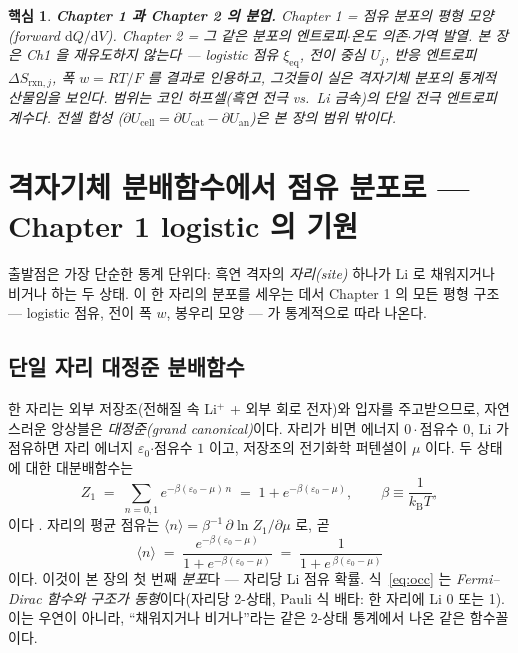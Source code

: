 \documentclass[11pt,a4paper]{article}
\newtheorem*{keybox}{핵심}
\newcommand{\dd}{\mathrm{d}}
\newcommand{\rxn}{\mathrm{rxn}}
\newcommand{\eq}{\mathrm{eq}}
\newcommand{\kB}{k_{\mathrm{B}}}
\newcommand{\avg}[1]{\langle #1\rangle}
\begin{document}
\begin{keybox}
\textbf{Chapter 1 과 Chapter 2 의 분업.} Chapter 1 = 점유 분포의 \emph{평형 모양}(forward
$\dd Q/\dd V$). Chapter 2 = 그 \emph{같은 분포}의 엔트로피$\cdot$온도 의존$\cdot$가역 발열. 본 장은 Ch1
을 재유도하지 않는다 — logistic 점유 $\xi_\eq$, 전이 중심 $U_j$, 반응 엔트로피 $\Delta S_{\rxn,j}$,
폭 $w=RT/F$ 를 \emph{결과로 인용}하고, 그것들이 실은 격자기체 분포의 통계적 산물임을 보인다. 범위는
\emph{코인 하프셀}(흑연 전극 vs.\ Li 금속)의 단일 전극 엔트로피 계수다. 전셀 합성
($\partial U_\mathrm{cell}=\partial U_\mathrm{cat}-\partial U_\mathrm{an}$)은 본 장의 범위 밖이다.
\end{keybox}

\section{격자기체 분배함수에서 점유 분포로 — Chapter 1 logistic 의 기원}\label{sec:partition}
출발점은 가장 단순한 통계 단위다: 흑연 격자의 \emph{자리(site)} 하나가 Li 로 채워지거나 비거나
하는 두 상태. 이 한 자리의 분포를 세우는 데서 Chapter 1 의 모든 평형 구조 — logistic 점유, 전이 폭
$w$, 봉우리 모양 — 가 통계적으로 따라 나온다.

\subsection{단일 자리 대정준 분배함수}
한 자리는 외부 저장조(전해질 속 Li$^+$ + 외부 회로 전자)와 입자를 주고받으므로, 자연스러운 앙상블은
\emph{대정준(grand canonical)}이다. 자리가 비면 에너지 $0\cdot$점유수 $0$, Li 가 점유하면 자리
에너지 $\varepsilon_0$$\cdot$점유수 $1$ 이고, 저장조의 전기화학 퍼텐셜이 $\mu$ 이다. 두 상태에 대한
대분배함수는
\begin{equation}
Z_1 \;=\; \sum_{n=0,1} e^{-\beta(\varepsilon_0 - \mu)\,n}
       \;=\; 1 + e^{-\beta(\varepsilon_0-\mu)},
\qquad \beta\equiv\frac{1}{\kB T},
\label{eq:Z1}
\end{equation}
이다 \cite{hill}. 자리의 평균 점유는 $\avg{n}=\beta^{-1}\,\partial\ln Z_1/\partial\mu$ 로, 곧
\begin{equation}
\boxed{\;\avg{n}
   \;=\;\frac{e^{-\beta(\varepsilon_0-\mu)}}{1+e^{-\beta(\varepsilon_0-\mu)}}
   \;=\;\frac{1}{1+e^{\,\beta(\varepsilon_0-\mu)}}\;}
\label{eq:occ}
\end{equation}
이다. 이것이 본 장의 첫 번째 \emph{분포}다 — 자리당 Li 점유 확률. 식~\eqref{eq:occ} 는
\emph{Fermi--Dirac 함수와 구조가 동형}이다(자리당 2-상태, Pauli 식 배타: 한 자리에 Li 0 또는 1).
이는 우연이 아니라, ``채워지거나 비거나''라는 같은 2-상태 통계에서 나온 같은 함수꼴이다.
\end{document}
